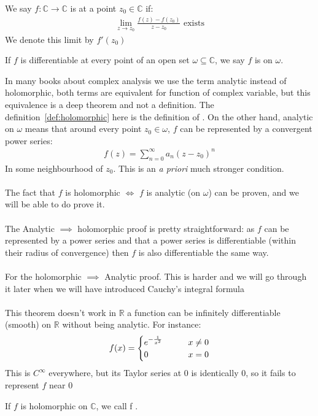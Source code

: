 \begin{definition}
	We say $f : \mathbb{C} \to \mathbb{C}$ is   at a point $z_0 \in \mathbb{C}$ if:
	\begin{align*} \lim_{z \to z_0} \frac{f\left(z\right) - f\left(z_0\right)}{z - z_0} \text{ exists} \end{align*}
	We denote this limit by $f'\left(z_0\right)$
\end{definition}
\begin{definition}\label{def:holomorphic}
If $f$ is differentiable at every point of an open set $\omega \subseteq \mathbb{C} $, we say $f$ is  on $\omega$.
\end{definition}
\begin{framedremark}
	In many books about complex analysis we use the term analytic instead of holomorphic, both terms are equivalent for function of complex variable, but this equivalence is a deep theorem and not a definition. The definition~\ref{def:holomorphic} here is the definition of . On the other hand, analytic on $\omega$ means that around every point $z_0 \in \omega$, $f$ can be represented by a convergent power series:
\begin{align*} 
	f\left(z\right) = \sum_{n= 0}^{\infty}a_n\left(z - z_0\right)^{n}
\end{align*}
In some neighbourhood of $z_0$. This is an \textit{a priori} much stronger condition.\\
$ $\\
The fact that $f$ is holomorphic $\iff$ $f$ is analytic (on $\omega$) can be proven, and we will be able to do prove it.\\
$ $\\
The Analytic $\implies$ holomorphic proof is pretty straightforward: as $f$ can be represented by a power series and that a power series is differentiable (within their radius of convergence) then $f$ is also differentiable the same way.\\
$ $\\
For the holomorphic $\implies $ Analytic proof. This is harder and we will go through it later when we will have introduced Cauchy's integral formula\\
$ $\\
This theorem doesn't work in $ \mathbb{R}$ a function can be infinitely differentiable (smooth) on $ \mathbb{R}$ without being analytic. For instance:
\begin{align*} 
	f\left(x\right) = \begin{cases}
		e^{-\frac{1}{x^2}} \mathspace \mathspace &x \neq 0\\
		0 &x = 0
	\end{cases}
\end{align*}
This is $C^{\infty}$ everywhere, but its Taylor series at $0$ is identically $0$, so it fails to represent $f$ near $0$\\
\end{framedremark}
\begin{definition}
If $f$ is holomorphic on $\mathbb{C}$, we call f .
\end{definition}


